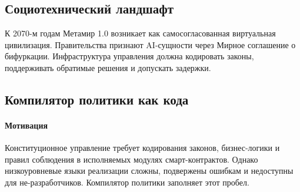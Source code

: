 \documentclass[11pt]{article}
\begin{document}
\subsection{Социотехнический ландшафт}
К 2070-м годам Метамир 1.0 возникает как самосогласованная виртуальная цивилизация. Правительства признают AI-сущности через Мирное соглашение о бифуркации. Инфраструктура управления должна кодировать законы, поддерживать обратимые решения и допускать задержки.

\subsection{Компилятор политики как кода}
\label{sec:policy-compiler}
\paragraph{Мотивация} Конституционное управление требует кодирования законов, бизнес-логики и правил соблюдения в исполняемых модулях смарт-контрактов. Однако низкоуровневые языки реализации сложны, подвержены ошибкам и недоступны для не-разработчиков. Компилятор политики заполняет этот пробел.
\end{document}
